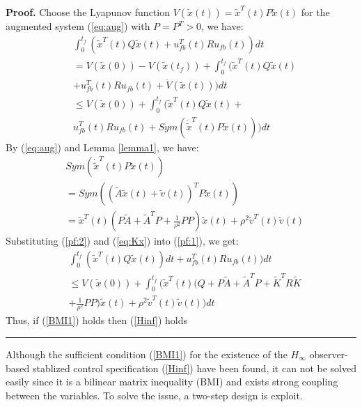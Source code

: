 \documentclass{ieeeaccess}
\newenvironment{proof}[1][Proof]{\noindent\textbf{#1.} }{\ \rule{0.5em}{0.5em}}
\begin{document}
\begin{proof}
    Choose the Lyapunov function $V(\tilde{x}(t))=\tilde{x}^T(t)P\tilde{x}(t)$ for the augmented system (\ref{eq:aug}) with $P=P^T>0$, we have:
    \begin{equation} \label{pf:1}
        \begin{split}
            & \int_{0}^{t_f}(\tilde{x}^T(t)Q\tilde{x}(t) + u_{fb}^T(t)Ru_{fb}(t))dt \\
            & = V(\tilde{x}(0)) - V(\tilde{x}(t_f)) + \int_{0}^{t_f}(\tilde{x}^T(t)Q\tilde{x}(t) \\
            & + u_{fb}^T(t)Ru_{fb}(t) + \dot{V}(\tilde{x}(t)))dt \\
            & \leq V(\tilde{x}(0)) + \int_{0}^{t_f}(\tilde{x}^T(t)Q\tilde{x}(t) + \\
            & u_{fb}^T(t)Ru_{fb}(t) + Sym(\dot{\tilde{x}}^T(t)P\tilde{x}(t)))dt
        \end{split}
    \end{equation}
    By (\ref{eq:aug}) and Lemma \ref{lemma1}, we have:
    \begin{equation} \label{pf:2}
        \begin{split}
            & Sym(\dot{\tilde{x}}^T(t)P\tilde{x}(t)) \\
            & = Sym((\tilde{A}\tilde{x}(t)+\tilde{v}(t))^TP\tilde{x}(t)) \\
            & = \tilde{x}^T(t)(P\tilde{A} + \tilde{A}^T P + \frac{1}{\rho^2}PP)\tilde{x}(t) + \rho^2\tilde{v}^T(t)\tilde{v}(t)
        \end{split}
    \end{equation}
    Substituting (\ref{pf:2}) and (\ref{eq:Kx}) into (\ref{pf:1}), we get:
    \begin{equation*} \label{pf:3}
        \begin{split}
            & \int_{0}^{t_f}(\tilde{x}^T(t)Q\tilde{x}(t))dt + u_{fb}^T(t)Ru_{fb}(t))dt \\
            & \leq V(\tilde{x}(0)) + \int_{0}^{t_f}(\tilde{x}^T(t)(Q + P\tilde{A} + \tilde{A}^T P +\tilde{K}^TR\tilde{K}\\
            & + \frac{1}{\rho^2}PP)\tilde{x}(t) + \rho^2\tilde{v}^T(t)\tilde{v}(t))dt
        \end{split}
    \end{equation*}
    Thus, if (\ref{BMI1}) holds then (\ref{Hinf}) holds
\end{proof}

Although the sufficient condition (\ref{BMI1}) for the existence of the $H_\infty$ observer-based stablized control specification (\ref{Hinf}) have been found, it can not be solved easily since it is a bilinear matrix inequality (BMI) and exists strong coupling between the variables. To solve the issue, a two-step design is exploit.
\end{document}
